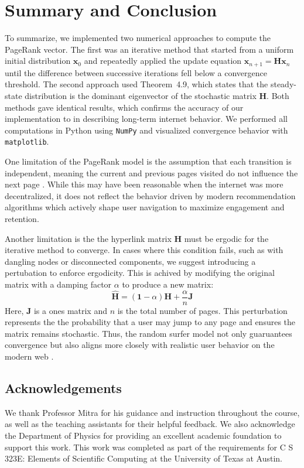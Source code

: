 \documentclass[linenumbers, twocolumn]{aastex631}
\begin{document}
\section{Summary and Conclusion} \label{sec:summary}


\noindent To summarize, we implemented two numerical approaches to compute the
PageRank vector. The first was an iterative method that started from a uniform
initial distribution $\boldsymbol{x}_0$ and repeatedly applied the
update equation $\boldsymbol{x}_{n+1}=\boldsymbol{H}\boldsymbol{x}_n$ until the
difference between successive iterations fell below a convergence threshold.
The second approach used Theorem~4.9, which states that the steady-state 
distribution is the dominant eigenvector of the stochastic matrix $\boldsymbol{H}$.
Both methods gave identical results, which confirms the accuracy of our
implementation to in describing long-term internet behavior. We performed all 
computations in Python using \texttt{NumPy} and visualized convergence 
behavior with \texttt{matplotlib}.

One limitation of the PageRank model is the assumption that each transition is
independent, meaning the current and previous pages visited do not influence
the next page \cite{langville1}. While this may have been reasonable when the 
internet was more decentralized, it does not reflect the behavior driven by 
modern recommendation algorithms which actively shape user navigation to 
maximize engagement and retention.

Another limitation is the the hyperlink matrix $\boldsymbol{H}$ must be ergodic
for the iterative method to converge. In cases where this condition fails, such
as with dangling nodes or disconnected components, we suggest introducing a
pertubation to enforce ergodicity. This is achived by modifying the original
matrix with a damping factor $\alpha$ to produce a new matrix:
\begin{equation}
    \hat{\boldsymbol{H}} = (\boldsymbol{1} - \alpha) \boldsymbol{H}+ \frac{\alpha}{n} \boldsymbol{J}
\end{equation}
Here, $\boldsymbol{J}$ is a ones matrix and $n$ is the total number of pages.
This perturbation represents the the probability that a user may jump to any 
page and ensures the matrix remains stochastic. Thus, the random surfer model
not only guaruantees convergence but also aligns more closely with realistic
user behavior on the modern web \cite{boldi}.\\


\subsection*{Acknowledgements}
We thank Professor Mitra for his guidance and instruction throughout the course,
as well as the teaching assistants for their helpful feedback. We also
acknowledge the Department of Physics for providing an excellent academic foundation 
to support this work. This work was completed as part of the requirements for 
C S 323E: Elements of Scientific Computing at the University of Texas at Austin.

\newpage


\end{document}

